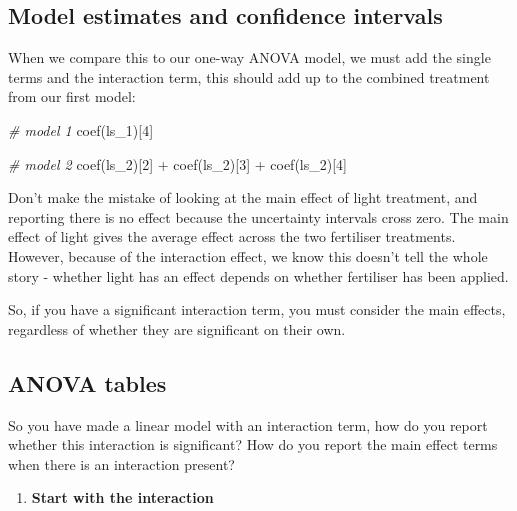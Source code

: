 \documentclass[
]{book}
\makeatletter
\newenvironment{Shaded}{\begin{snugshade}}{\end{snugshade}}
\newcommand{\CommentTok}[1]{\textcolor[rgb]{0.56,0.35,0.01}{\textit{#1}}}
\newcommand{\DecValTok}[1]{\textcolor[rgb]{0.00,0.00,0.81}{#1}}
\newcommand{\FunctionTok}[1]{\textcolor[rgb]{0.00,0.00,0.00}{#1}}
\newcommand{\NormalTok}[1]{#1}
\newcommand{\SpecialCharTok}[1]{\textcolor[rgb]{0.00,0.00,0.00}{#1}}
\providecommand{\tightlist}{%
  \setlength{\itemsep}{0pt}\setlength{\parskip}{0pt}}
\newenvironment{kframe}{%
\medskip{}
\setlength{\fboxsep}{.8em}
 \def\at@end@of@kframe{}%
 \ifinner\ifhmode%
  \def\at@end@of@kframe{\end{minipage}}%
  \begin{minipage}{\columnwidth}%
 \fi\fi%
 \def\FrameCommand##1{\hskip\@totalleftmargin \hskip-\fboxsep
 \colorbox{shadecolor}{##1}\hskip-\fboxsep
     \hskip-\linewidth \hskip-\@totalleftmargin \hskip\columnwidth}%
 \MakeFramed {\advance\hsize-\width
   \@totalleftmargin\z@ \linewidth\hsize
   \@setminipage}}%
 {\par\unskip\endMakeFramed%
 \at@end@of@kframe}
\newenvironment{block}[1]
  {
  \begin{itemize}
  \renewcommand{\labelitemi}{
    \raisebox{-.7\height}[0pt][0pt]{
      {\setkeys{Gin}{width=3em,keepaspectratio}\texttt{[image: images/\#1]}}
    }
  }
  \setlength{\fboxsep}{1em}
  \begin{kframe}
  \item
  }
  {
  \end{kframe}
  \end{itemize}
  }
\newenvironment{rmdwarning}
  {\begin{block}{warning}}
  {\end{block}}
\makeatother
\begin{document}
\hypertarget{model-estimates-and-confidence-intervals}{%
\subsection{Model estimates and confidence intervals}\label{model-estimates-and-confidence-intervals}}

When we compare this to our one-way ANOVA model, we must add the single terms and the interaction term, this should add up to the combined treatment from our first model:

\begin{Shaded}
\begin{Highlighting}[]
\CommentTok{\# model 1}
\FunctionTok{coef}\NormalTok{(ls\_1)[}\DecValTok{4}\NormalTok{]}

\CommentTok{\# model 2}
\FunctionTok{coef}\NormalTok{(ls\_2)[}\DecValTok{2}\NormalTok{] }\SpecialCharTok{+} \FunctionTok{coef}\NormalTok{(ls\_2)[}\DecValTok{3}\NormalTok{] }\SpecialCharTok{+} \FunctionTok{coef}\NormalTok{(ls\_2)[}\DecValTok{4}\NormalTok{]}
\end{Highlighting}
\end{Shaded}

\begin{rmdwarning}
Don't make the mistake of looking at the main effect of light treatment,
and reporting there is no effect because the uncertainty intervals cross
zero. The main effect of light gives the average effect across the two
fertiliser treatments. However, because of the interaction effect, we
know this doesn't tell the whole story - whether light has an effect
depends on whether fertiliser has been applied.

So, if you have a significant interaction term, you must consider the
main effects, regardless of whether they are significant on their own.
\end{rmdwarning}

\hypertarget{anova-tables}{%
\subsection{ANOVA tables}\label{anova-tables}}

So you have made a linear model with an interaction term, how do you report whether this interaction is significant? How do you report the main effect terms when there is an interaction present?

\begin{enumerate}
\def\labelenumi{\arabic{enumi}.}
\tightlist
\item
  \textbf{Start with the interaction}
\end{enumerate}
\end{document}
